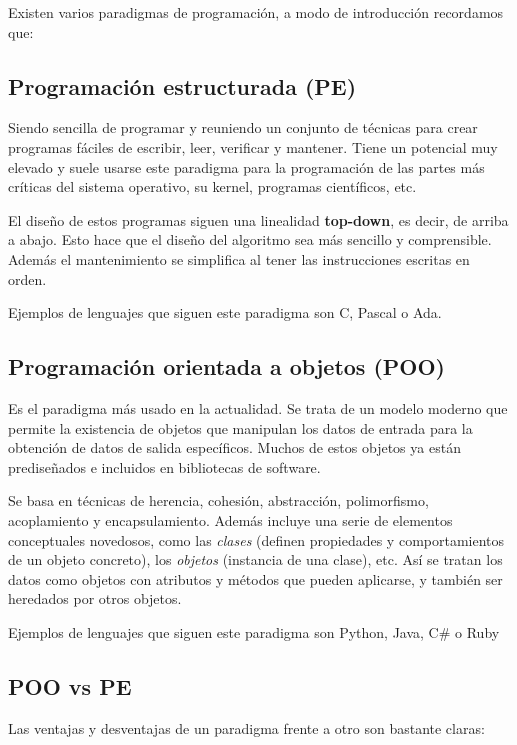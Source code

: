 \documentclass[a4paper, 11pt, titlepage]{article}
\begin{document}
    Existen varios paradigmas de programación, a modo de introducción recordamos que:

    \subsection{Programación estructurada (PE)} Siendo sencilla de programar y reuniendo un conjunto 
    de técnicas para crear programas fáciles de escribir, leer, verificar y mantener. Tiene un 
    potencial muy elevado y suele usarse este paradigma para la programación de las partes más
    críticas del sistema operativo, su kernel, programas científicos, etc.

    El diseño de estos programas siguen una linealidad \textbf{top-down}, es decir, de arriba a 
    abajo. Esto hace que el diseño del algoritmo sea más sencillo y comprensible. Además el 
    mantenimiento se simplifica al tener las instrucciones escritas en orden.

    Ejemplos de lenguajes que siguen este paradigma son C, Pascal o Ada.

    \subsection{Programación orientada a objetos (POO)} Es el paradigma más usado en la actualidad.
    Se trata de un modelo moderno que permite la existencia de objetos que manipulan los datos 
    de entrada para la obtención de datos de salida específicos. Muchos de estos objetos ya están 
    prediseñados e incluidos en bibliotecas de software.

    Se basa en técnicas de herencia, cohesión, abstracción, polimorfismo, acoplamiento y 
    encapsulamiento. Además incluye una serie de elementos conceptuales novedosos, como las \textit{clases}
    (definen propiedades y comportamientos de un objeto concreto), los \textit{objetos} 
    (instancia de una clase), etc. Así se tratan los datos como objetos con atributos y métodos que pueden 
    aplicarse, y también ser heredados por otros objetos.

    Ejemplos de lenguajes que siguen este paradigma son Python, Java, C\# o Ruby

    \subsection{POO vs PE}

    Las ventajas y desventajas de un paradigma frente a otro son bastante claras:
\end{document}
